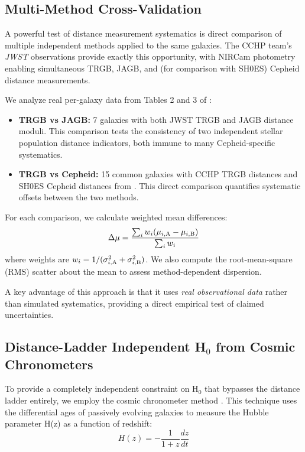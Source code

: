 \documentclass[preprint, linenumbers]{aastex701}
\begin{document}
\subsection{Multi-Method Cross-Validation} \label{sec:methods_crossval}

A powerful test of distance measurement systematics is direct comparison of multiple independent methods applied to the same galaxies. The CCHP team's \textit{JWST} observations \citep{Freedman2025a} provide exactly this opportunity, with NIRCam photometry enabling simultaneous TRGB, JAGB, and (for comparison with SH0ES) Cepheid distance measurements.

We analyze real per-galaxy data from Tables 2 and 3 of \citet{Freedman2025a}:

\begin{itemize}
\item \textbf{TRGB vs JAGB:} 7 galaxies with both JWST TRGB and JAGB distance moduli. This comparison tests the consistency of two independent stellar population distance indicators, both immune to many Cepheid-specific systematics.

\item \textbf{TRGB vs Cepheid:} 15 common galaxies with CCHP TRGB distances and SH0ES Cepheid distances from \citet{Riess2022}. This direct comparison quantifies systematic offsets between the two methods.
\end{itemize}

For each comparison, we calculate weighted mean differences:
\begin{equation}
\Delta\mu = \frac{\sum_i w_i (\mu_{i,\rm A} - \mu_{i,\rm B})}{\sum_i w_i}
\end{equation}
where weights are $w_i = 1/(\sigma_{i,\rm A}^2 + \sigma_{i,\rm B}^2)$. We also compute the root-mean-square (RMS) scatter about the mean to assess method-dependent dispersion.

A key advantage of this approach is that it uses \textit{real observational data} rather than simulated systematics, providing a direct empirical test of claimed uncertainties.

\subsection{Distance-Ladder Independent H$_0$ from Cosmic Chronometers} \label{sec:methods_h6}

To provide a completely independent constraint on H$_0$ that bypasses the distance ladder entirely, we employ the cosmic chronometer method \citep{Jimenez2002}. This technique uses the differential ages of passively evolving galaxies to measure the Hubble parameter H(z) as a function of redshift:
\begin{equation}
H(z) = -\frac{1}{1+z}\frac{dz}{dt}
\end{equation}
\end{document}
